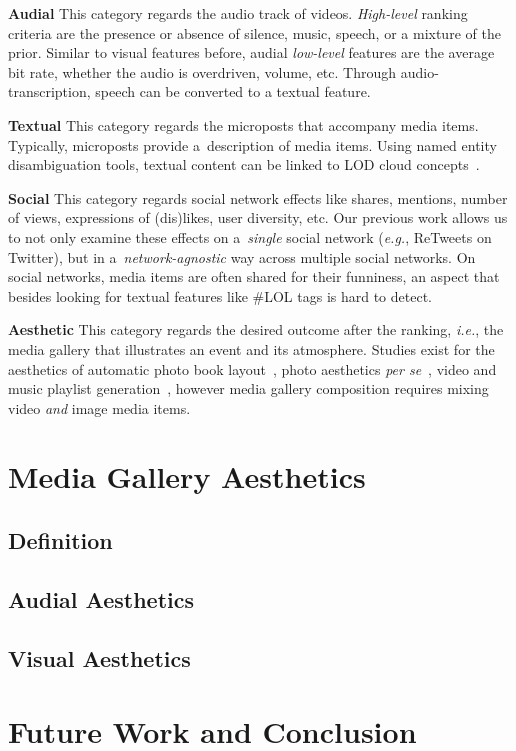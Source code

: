 \documentclass{article}
\begin{document}
\noindent \textbf{Audial}
This category regards the audio track of videos.
\emph{High-level} ranking criteria are the presence or absence
of silence, music, speech, or a mixture of the prior.
Similar to visual features before,
audial \emph{low-level}  features are the average bit rate,
whether the audio is overdriven, volume, etc.
Through audio-transcription, speech can be converted to a textual feature.

\noindent \textbf{Textual}
This category regards the microposts that accompany media items.
Typically, microposts provide a~description of media items.
Using named entity disambiguation tools,
textual content can be linked to LOD cloud concepts~\cite{Facebook2011}.

\noindent \textbf{Social}
This category regards social network effects like shares, mentions,
number of views, expressions of (dis)likes, user diversity, etc.
Our previous work allows us to not only examine these effects
on a~\emph{single} social network (\emph{e.g.}, ReTweets on Twitter),
but in a~\emph{network-agnostic} way across multiple social networks.
On social networks, media items are often shared for their funniness,
an aspect that besides looking for textual features
like \#LOL tags is hard to detect.

\noindent \textbf{Aesthetic}
This category regards the desired outcome after the ranking, \emph{i.e.},
the media gallery that illustrates an event and its atmosphere.
Studies exist for the aesthetics of
automatic photo book layout~\cite{Photo2011},
photo aesthetics \emph{per se}~\cite{Photo2012},
video and music playlist generation~\cite{YouTube2010,Playlist2006},
however media gallery composition requires mixing video
\emph{and} image media items.

\section{Media Gallery Aesthetics}

\subsection{Definition}

\subsection{Audial Aesthetics}

\subsection{Visual Aesthetics}

\section{Future Work and Conclusion}



\end{document}
